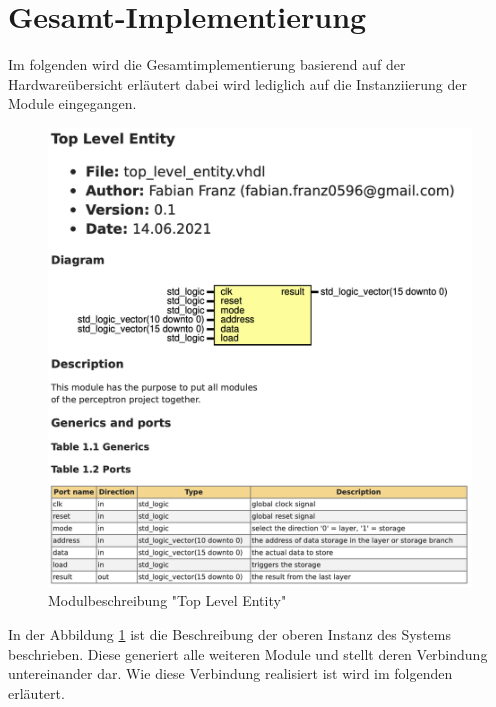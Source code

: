 \documentclass{article}
\numberwithin{equation}{section}
\begin{document}
\section{Gesamt-Implementierung}\label{sec:implementation}
Im folgenden wird die Gesamtimplementierung basierend auf der Hardwareübersicht erläutert
dabei wird lediglich auf die Instanziierung der Module eingegangen.
\begin{figure}[htb!]
    \begin{center}
      \includegraphics[width=13.25cm]{ModuleDescription/top_level_entity.png}
    \end{center}
    \caption{Modulbeschreibung "Top Level Entity"} \label{fig:top_level_entity}
  \end{figure}
\FloatBarrier
In der Abbildung \ref{fig:top_level_entity} ist die Beschreibung der oberen Instanz
des Systems beschrieben. Diese generiert alle weiteren Module und stellt deren Verbindung 
untereinander dar. Wie diese Verbindung realisiert ist wird im folgenden erläutert.
\pagebreak
\end{document}
